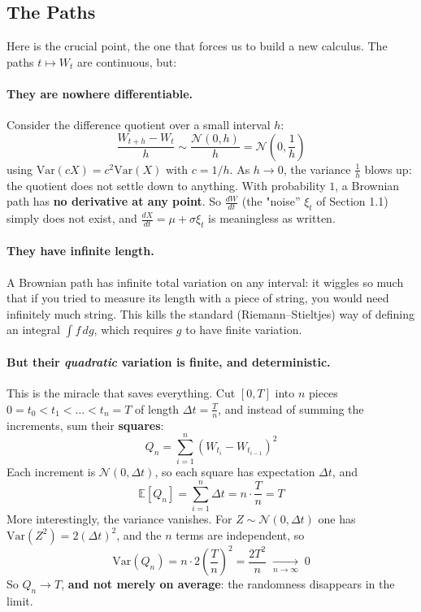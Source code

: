 \documentclass[]{article}
\newcommand{\E}{\mathbb{E}}
\newcommand{\Var}{\mathrm{Var}}
\begin{document}
	\subsection{The Paths}

	Here is the crucial point, the one that forces us to build a new calculus.
	The paths $t \mapsto W_t$ are continuous, but:

	\paragraph{They are nowhere differentiable.}
	Consider the difference quotient over a small interval $h$:
	$$
	\frac{W_{t+h} - W_t}{h} \sim \frac{\mathcal{N}(0,h)}{h} = \mathcal{N}\!\left(0, \frac{1}{h}\right)
	$$
	using $\Var(cX) = c^2\Var(X)$ with $c = 1/h$.
	As $h \to 0$, the variance $\frac{1}{h}$ blows up: the quotient does not settle down to anything.
	With probability $1$, a Brownian path has \textbf{no derivative at any point}.
	So $\frac{dW}{dt}$ (the "noise'' $\xi_t$ of Section 1.1) simply does not exist, and $\frac{dX}{dt} = \mu + \sigma \xi_t$ is meaningless as written.

	\paragraph{They have infinite length.}
	A Brownian path has infinite total variation on any interval: it wiggles so much that if you tried to measure its length with a piece of string, you would need infinitely much string.
	This kills the standard (Riemann--Stieltjes) way of defining an integral $\int f \, dg$, which requires $g$ to have finite variation.

	\paragraph{But their \textit{quadratic} variation is finite, and deterministic.}
	This is the miracle that saves everything.
	Cut $[0,T]$ into $n$ pieces $0 = t_0 < t_1 < \dots < t_n = T$ of length $\Delta t = \frac{T}{n}$, and instead of summing the increments, sum their \textbf{squares}:
	$$
	Q_n = \sum_{i=1}^{n} \left(W_{t_i} - W_{t_{i-1}}\right)^2
	$$
	Each increment is $\mathcal{N}(0, \Delta t)$, so each square has expectation $\Delta t$, and
	$$
	\E[Q_n] = \sum_{i=1}^n \Delta t = n \cdot \frac{T}{n} = T
	$$
	More interestingly, the variance vanishes. For $Z \sim \mathcal{N}(0,\Delta t)$ one has $\Var(Z^2) = 2(\Delta t)^2$, and the $n$ terms are independent, so
	$$
	\Var(Q_n) = n \cdot 2 \left(\frac{T}{n}\right)^2 = \frac{2T^2}{n} \; \xrightarrow[n \to \infty]{} \; 0
	$$
	So $Q_n \to T$, \textbf{and not merely on average}: the randomness disappears in the limit.
\end{document}
